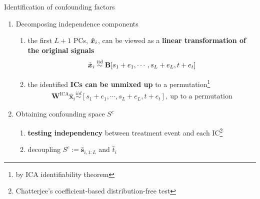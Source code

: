\documentclass[10pt]{beamer}
\begin{document}
\begin{frame}{Identification of confounding factors}
    \begin{enumerate}
        \item {Decomposing independence components}
        \begin{enumerate}
            \item the first $L+1$ PCs, $\Tilde{\bm{x}}_i$, can be viewed as
            a \textbf{linear transformation of the original signals}
            \begin{gather}
                \Tilde{\bm{x}}_i\overset{\text{iid}}{\sim}\mathbf{B}[s_1 + e_1, \cdots, s_L + e_L, t + e_t]
            \end{gather}
            \item the identified \textbf{ICs can be unmixed up} to a permutation\footnote{by ICA identifiability theorem}
            \begin{gather}
                \mathbf{W}^{\text{ICA}}\hat{\bm{x}}_i\overset{iid}{\sim}[s_1 + e_1 , \cdots , s_L + e_L, t + e_t],~\text{up to a permutation}
            \end{gather}
        \end{enumerate}
        \medskip
        \item {Obtaining confounding space} $S^c$
        \begin{enumerate}
            \item \textbf{testing independency} between treatment event and each IC\footnote{Chatterjee's coefficient-based distribution-free test}
            \item decoupling $S^c:=\hat{\bm{s}}_{i,1:L}$ and $\hat{t}_{i}$
        \end{enumerate}
    \end{enumerate} 
\end{frame}

\end{document}
